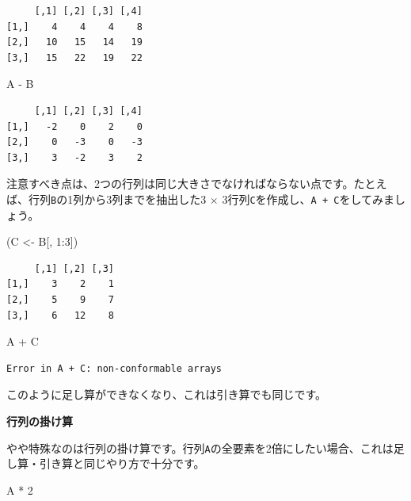 \documentclass[
  a4paper,
  pandoc,
  ja=standard,
  jafont=haranoaji]{bxjsbook}
\newenvironment{Shaded}{\begin{snugshade}}{\end{snugshade}}
\newcommand{\DecValTok}[1]{\textcolor[rgb]{0.68,0.00,0.00}{#1}}
\newcommand{\NormalTok}[1]{\textcolor[rgb]{0.00,0.48,0.65}{#1}}
\newcommand{\OtherTok}[1]{\textcolor[rgb]{0.00,0.48,0.65}{#1}}
\newcommand{\SpecialCharTok}[1]{\textcolor[rgb]{0.37,0.37,0.37}{#1}}
\begin{document}
\begin{verbatim}
     [,1] [,2] [,3] [,4]
[1,]    4    4    4    8
[2,]   10   15   14   19
[3,]   15   22   19   22
\end{verbatim}

\begin{Shaded}
\begin{Highlighting}[numbers=left,,]
\NormalTok{A }\SpecialCharTok{{-}}\NormalTok{ B}
\end{Highlighting}
\end{Shaded}

\begin{verbatim}
     [,1] [,2] [,3] [,4]
[1,]   -2    0    2    0
[2,]    0   -3    0   -3
[3,]    3   -2    3    2
\end{verbatim}

注意すべき点は、2つの行列は同じ大きさでなければならない点です。たとえば、行列\texttt{B}の1列から3列までを抽出した3
\(\times\) 3行列\texttt{C}を作成し、\texttt{A\ +\ C}をしてみましょう。

\begin{Shaded}
\begin{Highlighting}[numbers=left,,]
\NormalTok{(C }\OtherTok{\textless{}{-}}\NormalTok{ B[, }\DecValTok{1}\SpecialCharTok{:}\DecValTok{3}\NormalTok{])}
\end{Highlighting}
\end{Shaded}

\begin{verbatim}
     [,1] [,2] [,3]
[1,]    3    2    1
[2,]    5    9    7
[3,]    6   12    8
\end{verbatim}

\begin{Shaded}
\begin{Highlighting}[numbers=left,,]
\NormalTok{A }\SpecialCharTok{+}\NormalTok{ C}
\end{Highlighting}
\end{Shaded}

\begin{verbatim}
Error in A + C: non-conformable arrays
\end{verbatim}

このように足し算ができなくなり、これは引き算でも同じです。

\textbf{行列の掛け算}

やや特殊なのは行列の掛け算です。行列\texttt{A}の全要素を2倍にしたい場合、これは足し算・引き算と同じやり方で十分です。

\begin{Shaded}
\begin{Highlighting}[numbers=left,,]
\NormalTok{A }\SpecialCharTok{*} \DecValTok{2}
\end{Highlighting}
\end{Shaded}
\end{document}
